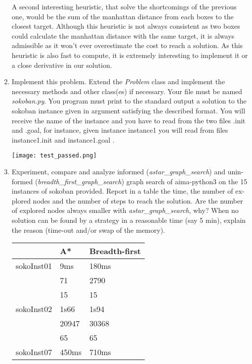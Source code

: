 \begin{enumerate}
\begin{framed}
    A second interesting heuristic, that solve the shortcomings of the
    previous one, would be the sum of the manhattan distance from each
    boxes to the closest target. Although this heuristic is not always
    consistent as two boxes could calculate the manhattan distance with the
    same target, it is always admissible as it won't ever overestimate the
    cost to reach a solution. As this heuristic is also fast to compute, it
    is extremely interesting to implement it or a close derivative in our
    solution.
    \end{framed}
  \item Implement this problem. Extend the \textit{Problem} class and implement the necessary
methods and other class(es) if necessary. Your file must be named \textit{sokoban.py}.
You program must print to the standard output a solution to the sokoban instance
given in argument satisfying the described format. You will receive the name
of the instance and you have to read from the two files .init and .goal, for
instance, given instance instance1 you will read from files instance1.init
and instance1.goal .
    \begin{framed}
        \texttt{[image: test\_passed.png]}
    \end{framed}
  \item Experiment, compare and analyze informed (\textit{astar\_graph\_search}) and unin-
formed (\textit{breadth\_first\_graph\_search}) graph search of aima-python3 on the 15
instances of sokoban provided. Report in a table the time, the number of ex-
plored nodes and the number of steps to reach the solution. Are the number of
explored nodes always smaller with \textit{astar\_graph\_search}, why?
When no solution can be found by a strategy in a reasonable time (say 5 min),
explain the reason (time-out and/or swap of the memory).
    \begin{framed}
    	\begin{tabular}{l|l|l}
    					& A* 		& Breadth-first\\
            \hline
    		sokoInst01 	& 9ms		& 180ms \\
    					& 71		& 2790 \\
    					& 15		& 15 \\
    		sokoInst02 	& 1s66		& 1s94 \\
    					& 20947 	& 30368 \\
    					& 65		& 65 \\
    		sokoInst07 	& 450ms		& 710ms \\

\end{tabular}
\end{framed}
\end{enumerate}

